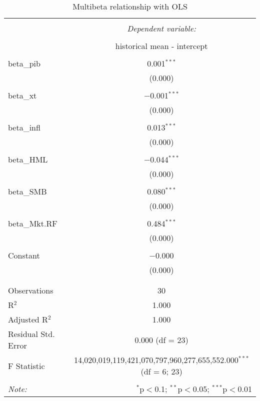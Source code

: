 
\begin{table}[!htbp] \centering 
  \caption{Multibeta relationship with OLS} 
  \label{} 
\begin{tabular}{@{\extracolsep{5pt}}lc} 
\\[-1.8ex]\hline 
\hline \\[-1.8ex] 
 & \multicolumn{1}{c}{\textit{Dependent variable:}} \\ 
\cline{2-2} 
\\[-1.8ex] & historical mean - intercept \\ 
\hline \\[-1.8ex] 
 beta\_pib & 0.001$^{***}$ \\ 
  & (0.000) \\ 
  & \\ 
 beta\_xt & $-$0.001$^{***}$ \\ 
  & (0.000) \\ 
  & \\ 
 beta\_infl & 0.013$^{***}$ \\ 
  & (0.000) \\ 
  & \\ 
 beta\_HML & $-$0.044$^{***}$ \\ 
  & (0.000) \\ 
  & \\ 
 beta\_SMB & 0.080$^{***}$ \\ 
  & (0.000) \\ 
  & \\ 
 beta\_Mkt.RF & 0.484$^{***}$ \\ 
  & (0.000) \\ 
  & \\ 
 Constant & $-$0.000 \\ 
  & (0.000) \\ 
  & \\ 
\hline \\[-1.8ex] 
Observations & 30 \\ 
R$^{2}$ & 1.000 \\ 
Adjusted R$^{2}$ & 1.000 \\ 
Residual Std. Error & 0.000 (df = 23) \\ 
F Statistic & 14,020,019,119,421,070,797,960,277,655,552.000$^{***}$ (df = 6; 23) \\ 
\hline 
\hline \\[-1.8ex] 
\textit{Note:}  & \multicolumn{1}{r}{$^{*}$p$<$0.1; $^{**}$p$<$0.05; $^{***}$p$<$0.01} \\ 
\end{tabular} 
\end{table} 
